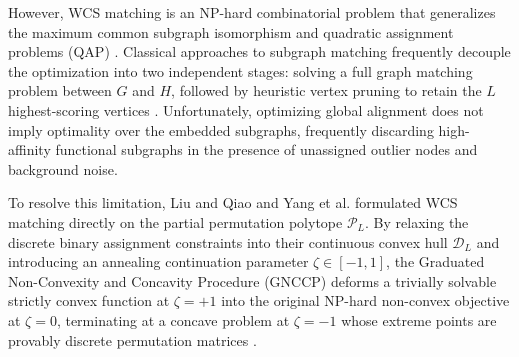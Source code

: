 \documentclass[conference]{IEEEtran}
\begin{document}
However, WCS matching is an NP-hard combinatorial problem that generalizes the maximum common subgraph isomorphism and quadratic assignment problems (QAP) \cite{garey1979, loiola2007}. Classical approaches to subgraph matching frequently decouple the optimization into two independent stages: solving a full graph matching problem between $G$ and $H$, followed by heuristic vertex pruning to retain the $L$ highest-scoring vertices \cite{zaslavskiy2009, gold1996}. Unfortunately, optimizing global alignment does not imply optimality over the embedded subgraphs, frequently discarding high-affinity functional subgraphs in the presence of unassigned outlier nodes and background noise.

To resolve this limitation, Liu and Qiao \cite{liu2015graduated} and Yang et al. \cite{yang2018algorithm} formulated WCS matching directly on the partial permutation polytope $\mathcal{P}_L$. By relaxing the discrete binary assignment constraints into their continuous convex hull $\mathcal{D}_L$ and introducing an annealing continuation parameter $\zeta \in [-1, 1]$, the Graduated Non-Convexity and Concavity Procedure (GNCCP) deforms a trivially solvable strictly convex function at $\zeta = +1$ into the original NP-hard non-convex objective at $\zeta = 0$, terminating at a concave problem at $\zeta = -1$ whose extreme points are provably discrete permutation matrices \cite{yang2018algorithm}.
\end{document}
